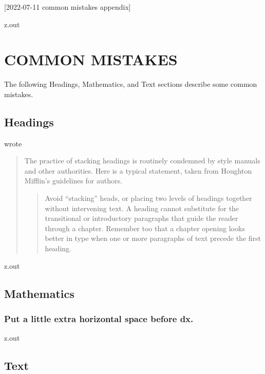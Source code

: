 [2022-07-11 common mistakes appendix]

\begin{VerbatimOut}{z.out}
\chapter{COMMON MISTAKES}

The following Headings, Mathematics, and Text
sections describe some common mistakes.


\section{Headings}

\textcite[page~289]{farkas2011}
wrote

\begin{quotation}
  The practice of stacking headings
  is routinely condemned by style manuals
  and other authorities.
  Here is a typical statement,
  taken from Houghton Mifflin's guidelines for authors.
  \begin{quotation}
    Avoid ``stacking'' heads,
    or placing two levels
    of headings together without intervening text.
    A heading cannot substitute
    for the transitional
    or introductory paragraphs
    that guide the reader through a chapter.
    Remember too that a chapter opening looks better in type
    when one
    or more paragraphs
    of text precede the first heading.
  \end{quotation}
\end{quotation}
\end{VerbatimOut}

\MyIO

\begin{VerbatimOut}{z.out}


\section{Mathematics}

\subsection{Put a little extra horizontal space before dx.}
\end{VerbatimOut}
\MyIO


\begin{VerbatimOut}{z.out}


\section{Text}
\end{VerbatimOut}

